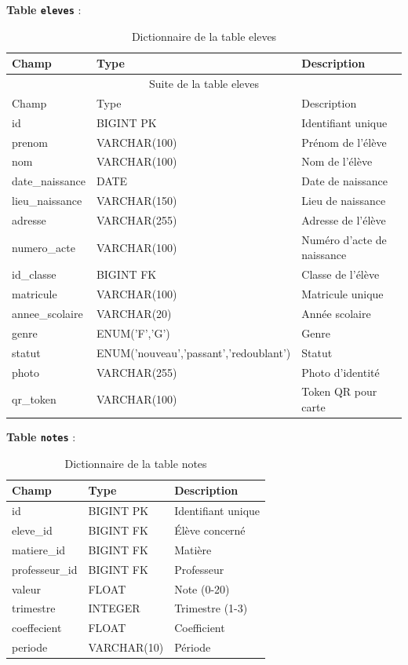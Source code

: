 \documentclass[12pt,a4paper,twoside]{report}
\begin{document}
\textbf{Table \texttt{eleves}} :
\begin{longtable}{lll}
\caption{Dictionnaire de la table eleves}\\
\toprule
Champ & Type & Description \\
\midrule
\endfirsthead
\multicolumn{3}{c}{Suite de la table eleves}\\
\toprule
Champ & Type & Description \\
\midrule
\endhead
\bottomrule
\endfoot
id & BIGINT PK & Identifiant unique \\
prenom & VARCHAR(100) & Prénom de l'élève \\
nom & VARCHAR(100) & Nom de l'élève \\
date\_naissance & DATE & Date de naissance \\
lieu\_naissance & VARCHAR(150) & Lieu de naissance \\
adresse & VARCHAR(255) & Adresse de l'élève \\
numero\_acte & VARCHAR(100) & Numéro d'acte de naissance \\
id\_classe & BIGINT FK & Classe de l'élève \\
matricule & VARCHAR(100) & Matricule unique \\
annee\_scolaire & VARCHAR(20) & Année scolaire \\
genre & ENUM('F','G') & Genre \\
statut & ENUM('nouveau','passant','redoublant') & Statut \\
photo & VARCHAR(255) & Photo d'identité \\
qr\_token & VARCHAR(100) & Token QR pour carte \\
\end{longtable}

\textbf{Table \texttt{notes}} :
\begin{table}[h]
\centering
\caption{Dictionnaire de la table notes}
\begin{tabular}{lll}
\toprule
Champ & Type & Description \\
\midrule
id & BIGINT PK & Identifiant unique \\
eleve\_id & BIGINT FK & Élève concerné \\
matiere\_id & BIGINT FK & Matière \\
professeur\_id & BIGINT FK & Professeur \\
valeur & FLOAT & Note (0-20) \\
trimestre & INTEGER & Trimestre (1-3) \\
coeffecient & FLOAT & Coefficient \\
periode & VARCHAR(10) & Période \\
\bottomrule
\end{tabular}
\end{table}
\end{document}
